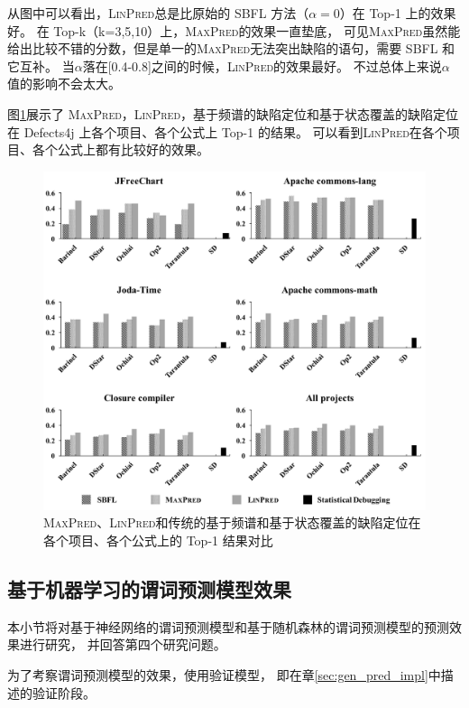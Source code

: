 从图中可以看出，\textsc{LinPred}总是比原始的 SBFL 方法（$\alpha = 0$）在 Top-1 上的效果好。
在 Top-k（k=3,5,10）上，\textsc{MaxPred}的效果一直垫底，
可见\textsc{MaxPred}虽然能给出比较不错的分数，但是单一的\textsc{MaxPred}无法突出缺陷的语句，需要 SBFL 和它互补。
当$\alpha$落在[0.4-0.8]之间的时候，\textsc{LinPred}的效果最好。
不过总体上来说$\alpha$值的影响不会太大。

图\ref{fig:all-figure-method-level}展示了
\textsc{MaxPred}，\textsc{LinPred}，基于频谱的缺陷定位和基于状态覆盖的缺陷定位
在 Defects4j 上各个项目、各个公式上 Top-1 的结果。
可以看到\textsc{LinPred}在各个项目、各个公式上都有比较好的效果。

\begin{figure}[htbp] 
\centering 
\includegraphics[width=15cm]{figure/all-figure-method-level} 
\caption{\textsc{MaxPred}、\textsc{LinPred}和传统的基于频谱和基于状态覆盖的缺陷定位在各个项目、各个公式上的 Top-1 结果对比} 
\label{fig:all-figure-method-level}
\end{figure}

\subsection{基于机器学习的谓词预测模型效果}

本小节将对基于神经网络的谓词预测模型和基于随机森林的谓词预测模型的预测效果进行研究，
并回答第四个研究问题。

为了考察谓词预测模型的效果，使用验证模型，
即在章\ref{sec:gen_pred_impl}中描述的验证阶段。

